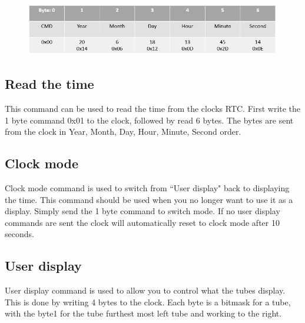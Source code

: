 \documentclass[12pt]{article}
\begin{document}
\begin{figure}[!h]
\includegraphics[scale=0.5]{setTime}
\centering
\caption*{}
\label{fig:status}
\end{figure}

\subsection{Read the time}
This command can be used to read the time from the clocks RTC. First write the 1 byte command 0x01 to the clock, followed by read 6 bytes. The bytes are sent from the clock in Year, Month, Day, Hour, Minute, Second order. 

\subsection{Clock mode}
Clock mode command is used to switch from ``User display" back to displaying the time. This command should be used when you no longer want to use it as a display. Simply send the 1 byte command to switch mode. If no user display commands are sent the clock will automatically reset to clock mode after 10 seconds. 

\subsection{User display}
User display command is used to allow you to control what the tubes display. This is done by writing 4 bytes to the clock. Each byte is a bitmask for a tube, with the byte1 for the tube furthest most left tube and working to the right.
\end{document}
